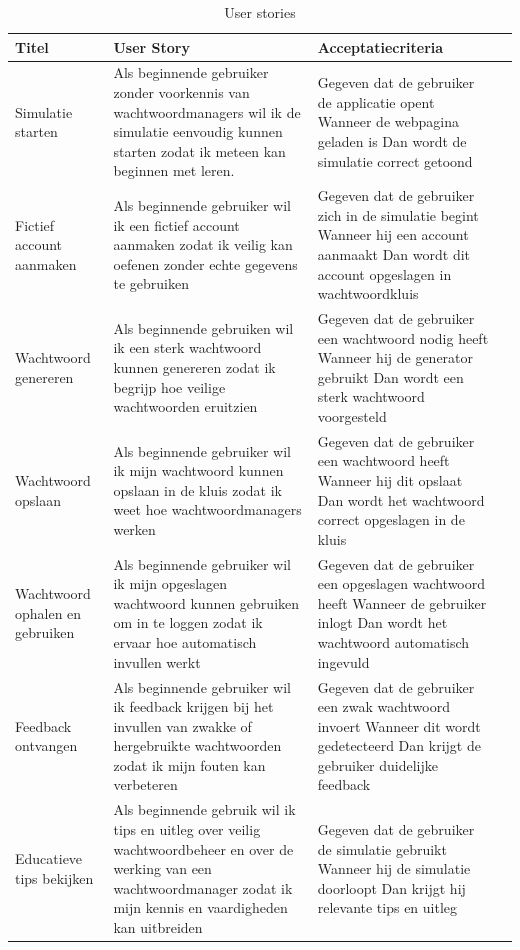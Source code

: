 \begin{table}[H]
\footnotesize
\centering
\begin{tabularx}{\textwidth}{l X X X}
\toprule
\textbf{Titel} & \textbf{User Story} & \textbf{Acceptatiecriteria}\\
\midrule

Simulatie starten & Als beginnende gebruiker zonder voorkennis van wachtwoordmanagers wil ik de simulatie eenvoudig kunnen starten zodat ik meteen kan beginnen met leren. & Gegeven dat de gebruiker de applicatie opent Wanneer de webpagina geladen is Dan wordt de simulatie correct getoond  \\

Fictief account aanmaken & Als beginnende gebruiker wil ik een fictief account aanmaken zodat ik veilig kan oefenen zonder echte gegevens te gebruiken & Gegeven dat de gebruiker zich in de simulatie begint Wanneer hij een account aanmaakt Dan wordt dit account opgeslagen in wachtwoordkluis  \\

Wachtwoord genereren & Als beginnende gebruiken wil ik een sterk wachtwoord kunnen genereren zodat ik begrijp hoe veilige wachtwoorden eruitzien & Gegeven dat de gebruiker een wachtwoord nodig heeft Wanneer hij de generator gebruikt Dan wordt een sterk wachtwoord voorgesteld  \\

Wachtwoord opslaan & Als beginnende gebruiker wil ik mijn wachtwoord kunnen opslaan in de kluis zodat ik weet hoe wachtwoordmanagers werken & Gegeven dat de gebruiker een wachtwoord heeft Wanneer hij dit opslaat Dan wordt het wachtwoord correct opgeslagen in de kluis  \\

Wachtwoord ophalen en gebruiken & Als beginnende gebruiker wil ik mijn opgeslagen wachtwoord kunnen gebruiken om in te loggen zodat ik ervaar hoe automatisch invullen werkt & Gegeven dat de gebruiker een opgeslagen wachtwoord heeft Wanneer de gebruiker inlogt Dan wordt het wachtwoord automatisch ingevuld  \\

Feedback ontvangen & Als beginnende gebruiker wil ik feedback krijgen bij het invullen van zwakke of hergebruikte wachtwoorden zodat ik mijn fouten kan verbeteren & Gegeven dat de gebruiker een zwak wachtwoord invoert Wanneer dit wordt gedetecteerd Dan krijgt de gebruiker duidelijke feedback  \\

Educatieve tips bekijken & Als beginnende gebruik wil ik tips en uitleg over veilig wachtwoordbeheer en over de werking van een wachtwoordmanager zodat ik mijn kennis en vaardigheden kan uitbreiden & Gegeven dat de gebruiker de simulatie gebruikt Wanneer hij de simulatie doorloopt Dan krijgt hij relevante tips en uitleg  \\


\bottomrule
\end{tabularx}
\caption{User stories}
\end{table}

